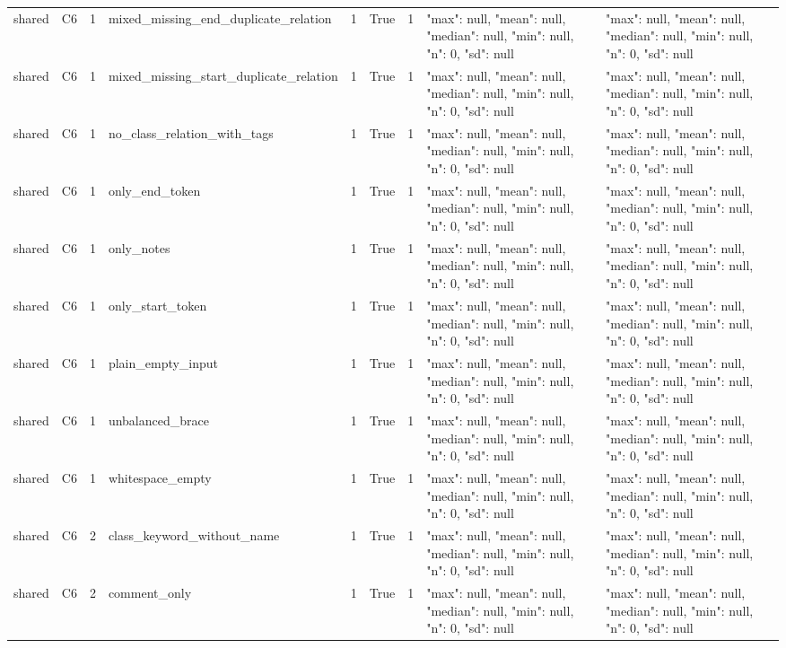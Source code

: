 \begin{tabular}{lllllllll}
shared & C6 & 1 & mixed\_missing\_end\_duplicate\_relation & 1 & True & 1 & {"max": null, "mean": null, "median": null, "min": null, "n": 0, "sd": null} & {"max": null, "mean": null, "median": null, "min": null, "n": 0, "sd": null} \\
shared & C6 & 1 & mixed\_missing\_start\_duplicate\_relation & 1 & True & 1 & {"max": null, "mean": null, "median": null, "min": null, "n": 0, "sd": null} & {"max": null, "mean": null, "median": null, "min": null, "n": 0, "sd": null} \\
shared & C6 & 1 & no\_class\_relation\_with\_tags & 1 & True & 1 & {"max": null, "mean": null, "median": null, "min": null, "n": 0, "sd": null} & {"max": null, "mean": null, "median": null, "min": null, "n": 0, "sd": null} \\
shared & C6 & 1 & only\_end\_token & 1 & True & 1 & {"max": null, "mean": null, "median": null, "min": null, "n": 0, "sd": null} & {"max": null, "mean": null, "median": null, "min": null, "n": 0, "sd": null} \\
shared & C6 & 1 & only\_notes & 1 & True & 1 & {"max": null, "mean": null, "median": null, "min": null, "n": 0, "sd": null} & {"max": null, "mean": null, "median": null, "min": null, "n": 0, "sd": null} \\
shared & C6 & 1 & only\_start\_token & 1 & True & 1 & {"max": null, "mean": null, "median": null, "min": null, "n": 0, "sd": null} & {"max": null, "mean": null, "median": null, "min": null, "n": 0, "sd": null} \\
shared & C6 & 1 & plain\_empty\_input & 1 & True & 1 & {"max": null, "mean": null, "median": null, "min": null, "n": 0, "sd": null} & {"max": null, "mean": null, "median": null, "min": null, "n": 0, "sd": null} \\
shared & C6 & 1 & unbalanced\_brace & 1 & True & 1 & {"max": null, "mean": null, "median": null, "min": null, "n": 0, "sd": null} & {"max": null, "mean": null, "median": null, "min": null, "n": 0, "sd": null} \\
shared & C6 & 1 & whitespace\_empty & 1 & True & 1 & {"max": null, "mean": null, "median": null, "min": null, "n": 0, "sd": null} & {"max": null, "mean": null, "median": null, "min": null, "n": 0, "sd": null} \\
shared & C6 & 2 & class\_keyword\_without\_name & 1 & True & 1 & {"max": null, "mean": null, "median": null, "min": null, "n": 0, "sd": null} & {"max": null, "mean": null, "median": null, "min": null, "n": 0, "sd": null} \\
shared & C6 & 2 & comment\_only & 1 & True & 1 & {"max": null, "mean": null, "median": null, "min": null, "n": 0, "sd": null} & {"max": null, "mean": null, "median": null, "min": null, "n": 0, "sd": null} \\

\end{tabular}
